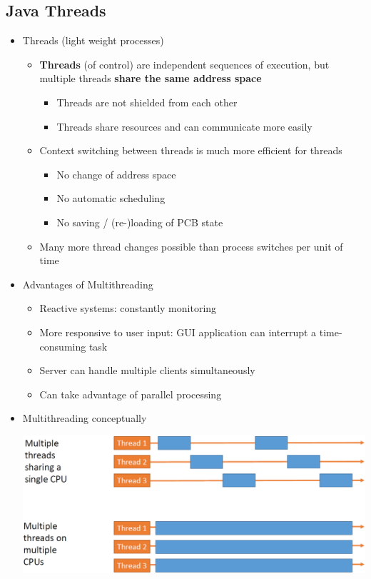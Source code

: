 \documentclass[a4paper]{article}
\begin{document}
\subsection*{Java Threads}
	\begin{itemize}
		\item Threads (light weight processes)
			\begin{itemize}
				\item \textbf{Threads} (of control) are independent sequences of execution, but multiple threads \textbf{share the same address space}
					\begin{itemize}
						\item Threads are not shielded from each other
						\item Threads share resources and can communicate more easily
					\end{itemize}
				\item Context switching between threads is much more efficient for threads
					\begin{itemize}
						\item No change of address space
						\item No automatic scheduling
						\item No saving / (re-)loading of PCB state
					\end{itemize}
				\item Many more thread changes possible than process switches per unit of time
			\end{itemize}
		\item Advantages of Multithreading
			\begin{itemize}
				\item Reactive systems: constantly monitoring
				\item More responsive to user input: GUI application can interrupt a time-consuming task
				\item Server can handle multiple clients simultaneously
				\item Can take advantage of parallel processing
			\end{itemize}
		\item Multithreading conceptually\\
			\begin{center}
				\includegraphics[scale=1]{Figures/MultithreadingConceptually.jpg}

\end{center}
\end{itemize}
\end{document}
